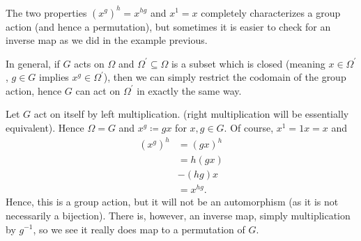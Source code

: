 \begin{remark}[Permutations]
	The two properties \(\left( x^{g} \right)^{h}= x^{hg} \) and \(x^{1}= x\) completely characterizes a group action (and hence a permutation), but sometimes it is easier to check for an inverse map as we did in the example previous.
\end{remark}
In general, if \(G\) acts on \(\Omega\) and \(\Omega^{\prime} \subseteq \Omega\) is a subset which is closed (meaning \(x \in \Omega^{\prime}\), \(g \in G\) implies \(x^{g}\in \Omega ^{\prime}\)), then we can simply restrict the codomain of the group action, hence \(G\) can act on \(\Omega^{\prime}\) in exactly the same way.
\begin{example}
	Let \(G\) act on itself by left multiplication. (right multiplication will be essentially equivalent). Hence \(\Omega = G\)	 and \(x^{g}\coloneqq gx\) for \(x, g \in G\). Of course, \(x^{1}= 1x = x\) and
	\begin{align*}
		\left( x^{g} \right)^{h}&= \left( gx \right) ^{h}  \\
		&= h\left( gx \right) \\
		&-\left( hg \right) x\\
		&= x^{hg}
	.\end{align*}
Hence, this is a group action, but it will not be an automorphism (as it is not necessarily a bijection). There is, however, an inverse map, simply multiplication by \(g^{-1}\), so we see it really does map to a permutation of \(G\).
\end{example}
